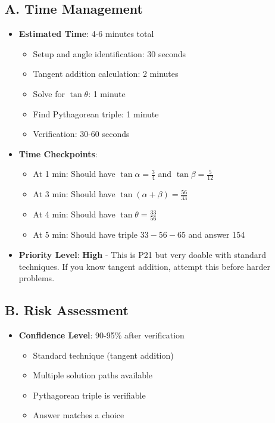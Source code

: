 \documentclass[12pt]{article}
\begin{document}
\begin{competitionbox}
\subsection*{A. Time Management}
\begin{itemize}[leftmargin=*]
    \item \textbf{Estimated Time}: 4-6 minutes total
    \begin{itemize}
        \item Setup and angle identification: 30 seconds
        \item Tangent addition calculation: 2 minutes
        \item Solve for $\tan\theta$: 1 minute
        \item Find Pythagorean triple: 1 minute
        \item Verification: 30-60 seconds
    \end{itemize}
    
    \item \textbf{Time Checkpoints}: 
    \begin{itemize}
        \item At 1 min: Should have $\tan\alpha = \frac{3}{4}$ and $\tan\beta = \frac{5}{12}$
        \item At 3 min: Should have $\tan(\alpha + \beta) = \frac{56}{33}$
        \item At 4 min: Should have $\tan\theta = \frac{33}{56}$
        \item At 5 min: Should have triple $33-56-65$ and answer 154
    \end{itemize}
    
    \item \textbf{Priority Level}: \textbf{High} - This is P21 but very doable with standard techniques. If you know tangent addition, attempt this before harder problems.
\end{itemize}

\subsection*{B. Risk Assessment}
\begin{itemize}[leftmargin=*]
    \item \textbf{Confidence Level}: 90-95\% after verification
    \begin{itemize}
        \item Standard technique (tangent addition)
        \item Multiple solution paths available
        \item Pythagorean triple is verifiable
        \item Answer matches a choice
    \end{itemize}
    

\end{itemize}
\end{competitionbox}
\end{document}
